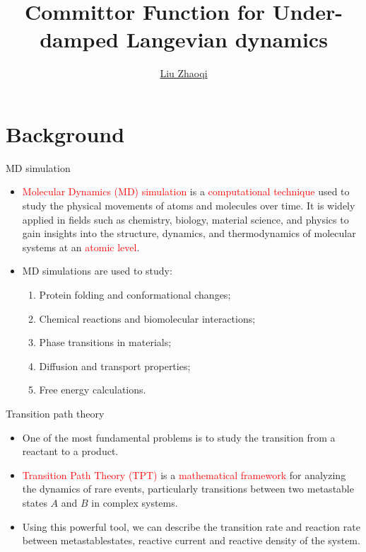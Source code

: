 \documentclass{beamer}
\author{\href{}{Liu Zhaoqi}}
\institute{\href{}{School of Mathematical sciences , Peking University}}
\title{Committor Function for Under-damped Langevian dynamics}
\date{}
\newcommand{\rred}{\textcolor{red}}
\begin{document}
\kaishu
\begin{frame}
    \titlepage

\end{frame}

\begin{frame}
\tableofcontents[sectionstyle=show,subsectionstyle=show/shaded/hide,subsubsectionstyle=show/shaded/hide]
\end{frame}

\section{Background}
\begin{frame}{MD simulation}
    \begin{itemize}
        \item \rred{Molecular Dynamics (MD) simulation} is a \textcolor{red}{computational technique} used to study the physical movements of atoms and molecules over time. 
        It is widely applied in fields such as chemistry, biology, material science, and physics to gain insights into the structure, dynamics, and thermodynamics of molecular systems at an \textcolor{red}{atomic level}.
        \item MD simulations are used to study:
        \begin{enumerate}
            \item Protein folding and conformational changes;
            \item Chemical reactions and biomolecular interactions;
            \item Phase transitions in materials;
            \item Diffusion and transport properties;
            \item Free energy calculations.
        \end{enumerate}
    \end{itemize}
\end{frame}

\begin{frame}{Transition path theory}
    \begin{itemize}
        \item One of the most fundamental problems is to study the transition from a reactant to a product.
        \item \rred{Transition Path Theory (TPT)} \cite{vanden2010transition} is a \rred{mathematical framework} for analyzing the dynamics of rare events, 
        particularly transitions between two metastable states $A$ and $B$ in complex systems.
        \item Using this powerful tool, we can describe the transition rate and reaction rate between metastablestates, reactive current and reactive density of the system.
    \end{itemize}
\end{frame}
\end{document}
